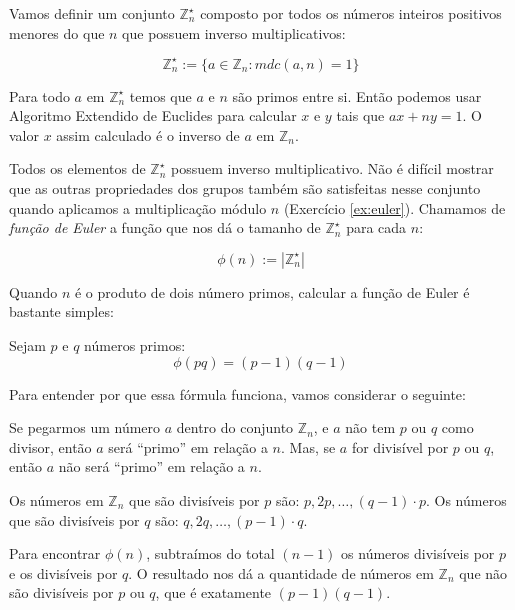 Vamos definir um conjunto $\mathbb{Z}_n^\star$ composto por todos os números inteiros positivos menores do que $n$ que possuem inverso multiplicativos:

\begin{displaymath}
  \mathbb{Z}_n^\star := \{a \in \mathbb{Z}_n : mdc(a,n) = 1\}
\end{displaymath}

Para todo $a$ em $\mathbb{Z}_n^\star$ temos que $a$ e $n$ são primos entre si.
Então podemos usar Algoritmo Extendido de Euclides para calcular $x$ e $y$ tais que $ax + ny = 1$.
O valor $x$ assim calculado é o inverso de $a$ em $\mathbb{Z}_n$.

Todos os elementos de $\mathbb{Z}_n^\star$ possuem inverso multiplicativo.
Não é difícil mostrar que as outras propriedades dos grupos também são satisfeitas nesse conjunto quando aplicamos a multiplicação módulo $n$ (Exercício \ref{ex:euler}).
Chamamos de {\em função de Euler} a função que nos dá o tamanho de $\mathbb{Z}_n^\star$ para cada $n$:

\begin{displaymath}
  \phi(n) := |\mathbb{Z}_n^\star|
\end{displaymath}

Quando $n$ é o produto de dois número primos, calcular a função de Euler é bastante simples:

\begin{proposition}
Sejam $p$ e $q$ números primos:
\begin{displaymath}
  \phi(pq) = (p - 1)(q - 1)
\end{displaymath}
\end{proposition}

Para entender por que essa fórmula funciona, vamos considerar o seguinte:

Se pegarmos um número $a$ dentro do conjunto $\mathbb{Z}_n$, e $a$ não tem $p$ ou $q$ como divisor, então $a$ será ``primo'' em relação a $n$.
Mas, se $a$ for divisível por $p$ ou $q$, então $a$ não será ``primo'' em relação a $n$.

Os números em $\mathbb{Z}_n$ que são divisíveis por $p$ são: $p, 2p, \dots, (q-1) \cdot p$.
Os números que são divisíveis por $q$ são: $q, 2q, \dots, (p-1) \cdot q$.

Para encontrar $\phi(n)$, subtraímos do total $(n-1)$ os números divisíveis por $p$ e os divisíveis por $q$.
O resultado nos dá a quantidade de números em $\mathbb{Z}_n$ que não são divisíveis por $p$ ou $q$, que é exatamente $(p-1)(q-1)$.

